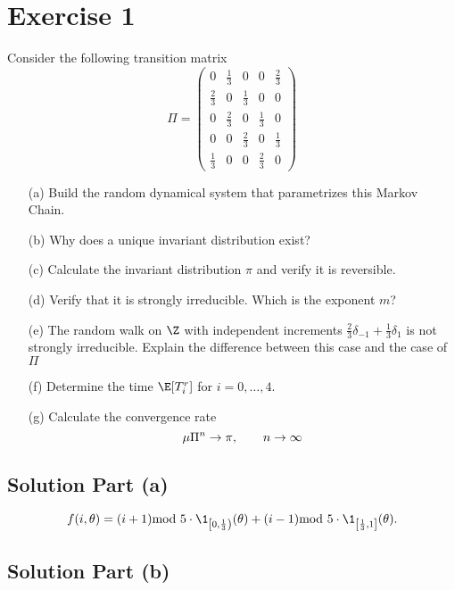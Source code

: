 \section{Exercise 1}
Consider the following transition matrix
\[ \Pi = \left(\begin{matrix}0 & \frac{1}{3} & 0 & 0 & \frac{2}{3}\\\frac{2}{3} & 0 & \frac{1}{3} & 0 & 0\\0 & \frac{2}{3} & 0 & \frac{1}{3} & 0\\0 & 0 & \frac{2}{3} & 0 & \frac{1}{3}\\\frac{1}{3} & 0 & 0 & \frac{2}{3} & 0\end{matrix}\right) \]

\begin{enumerate}
    \item[(a)] Build the random dynamical system that parametrizes this Markov Chain.
    \item[(b)] Why does a unique invariant distribution exist?
    \item[(c)] Calculate the invariant distribution $\pi$ and verify it is reversible.
    \item[(d)] Verify that it is strongly irreducible. Which is the exponent $m$?
    \item[(e)] The random walk on $\Z$ with independent increments $\frac{2}{3}\delta_{-1} + \frac{1}{3} \delta_{1}$ is not strongly irreducible. Explain the difference between this case and the case of $\Pi$
    \item[(f)] Determine the time $\E[T_{i}^{r}]$ for $i = 0,\ldots, 4$.
    \item[(g)] Calculate the convergence rate
    \[ \mu \Pi^n \to \pi,\hspace*{2em} n \to \infty \]      
\end{enumerate}

\subsection*{Solution Part (a)}

\[ f(i,\theta) = (i+1) \mbox{mod }5\cdot\1_{\left[0,\frac{1}{3}\right)}(\theta) + (i-1) \mbox{mod }5\cdot\1_{\left[\frac{1}{3}, 1\right]}(\theta). \]

\subsection*{Solution Part (b)}


